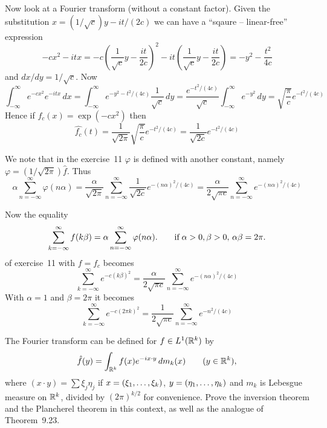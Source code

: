 \begin{enumerate}
\begin{itemize}
Now look at a Fourier transform (without a constant factor).
Given the substitution \(x = (1/\sqrt{c})y - it/(2c)\) we can 
have a ``sqaure -- linear-free'' expression
\begin{equation*}
-cx^2 -itx 
= -c\left(\frac{1}{\sqrt{c}}y - \frac{it}{2c}\right)^2
  -it\left(\frac{1}{\sqrt{c}}y - \frac{it}{2c}\right)
= -y^2 - \frac{t^2}{4c}
\end{equation*}
and \(dx/dy = 1/\sqrt{c}\). Now
\begin{equation*}
\int_{-\infty}^\infty e^{-cx^2}e^{-itx}\,dx
= \int_{-\infty}^\infty e^{-y^2 - t^2/(4c)}\frac{1}{\sqrt{c}}\,dy
= \frac{e^{-t^2/(4c)}}{\sqrt{c}}
   \int_{-\infty}^\infty e^{-y^2}\,dy
= \sqrt{\frac{\pi}{c}}e^{-t^2/(4c)}
\end{equation*}
Hence if \(f_c(x) = \exp(-cx^2)\) then
\begin{equation} \label{eq:gaussian:fourier}
\widehat{f_c}(t) 
= \frac{1}{\sqrt{2\pi}} \sqrt{\frac{\pi}{c}}e^{-t^2/(4c)}
= \frac{1}{\sqrt{2c}} e^{-t^2/(4c)}
\end{equation}

We note that 
in the exercise~11
\(\varphi\) 
is defined with another constant, namely
\(\varphi = (1/\sqrt{2\pi})\widehat{f}\).
Thus 
\begin{equation*}
\alpha \sum_{n = -\infty}^\infty \varphi(n\alpha)
= \frac{\alpha}{\sqrt{2\pi}} \sum_{n = -\infty}^\infty 
  \frac{1}{\sqrt{2c}} e^{-(n\alpha)^2/(4c)}
= \frac{\alpha}{2\sqrt{\pi c}} \sum_{n = -\infty}^\infty  e^{-(n\alpha)^2/(4c)}
\end{equation*}

Now the equality
\begin{equation} 
\sum_{k = -\infty}^\infty f(k\beta) 
= \alpha \sum_{n = -\infty}^\infty \varphi(n\alpha).
\qquad \textnormal{if}\; \alpha>0, \beta>0,\, \alpha\beta = 2\pi.
\end{equation}
of exercise~11 with \(f=f_c\) becomes
\begin{equation*}
\sum_{k = -\infty}^\infty e^{-c(k\beta)^2}
= \frac{\alpha}{2\sqrt{\pi c}} \sum_{n = -\infty}^\infty  e^{-(n\alpha)^2/(4c)}
\end{equation*}
With \(\alpha=1\) and \(\beta=2\pi\) it becomes
\begin{equation*}
\sum_{k = -\infty}^\infty e^{-c(2\pi k)^2}
= \frac{1}{2\sqrt{\pi c}} \sum_{n = -\infty}^\infty  e^{-n^2/(4c)}
\end{equation*}
\end{itemize}


\begin{excopy}
The Fourier transform can be defined for \(f\in L^1(\mathbb{R}^k)\) by
\begin{equation*}
\Hat{f}(y) = \int_{\mathbb{R}^k} f(x)e^{-ix\cdot y}\,dm_k(x)\qquad (y\in\mathbb{R}^k),
\end{equation*}
where \((x\cdot y) = \sum \xi_j \eta_j\) if 
\(x= (\xi_1,\ldots,\xi_{k})\),
\(y= (\eta_1,\ldots,\eta_{k})\)
and \(m_k\) is Lebesgue measure on \(\mathbb{R}^k\),
divided by \((2\pi)^{k/2}\) for convenience. Prove the inversion theorem and
the Plancherel theorem in this context, as well as the analogue of Theorem~9.23.
\end{excopy}


\end{enumerate}
